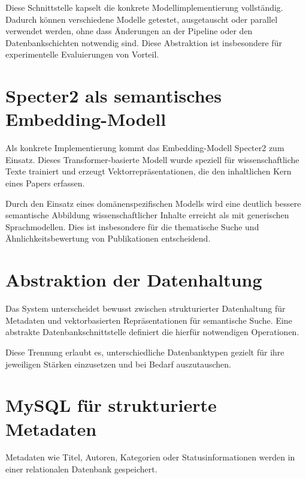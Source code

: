 Diese Schnittstelle kapselt die konkrete Modellimplementierung vollständig. Dadurch können verschiedene Modelle getestet, ausgetauscht oder parallel verwendet werden, ohne dass Änderungen an der Pipeline oder den Datenbankschichten notwendig sind. Diese Abstraktion ist insbesondere für experimentelle Evaluierungen von Vorteil.

\section{Specter2 als semantisches Embedding-Modell}

Als konkrete Implementierung kommt das Embedding-Modell Specter2 zum Einsatz. Dieses Transformer-basierte Modell wurde speziell für wissenschaftliche Texte trainiert und erzeugt Vektorrepräsentationen, die den inhaltlichen Kern eines Papers erfassen.



Durch den Einsatz eines domänenspezifischen Modells wird eine deutlich bessere semantische Abbildung wissenschaftlicher Inhalte erreicht als mit generischen Sprachmodellen. Dies ist insbesondere für die thematische Suche und Ähnlichkeitsbewertung von Publikationen entscheidend.

\section{Abstraktion der Datenhaltung}

Das System unterscheidet bewusst zwischen strukturierter Datenhaltung für Metadaten und vektorbasierten Repräsentationen für semantische Suche. Eine abstrakte Datenbankschnittstelle definiert die hierfür notwendigen Operationen.



Diese Trennung erlaubt es, unterschiedliche Datenbanktypen gezielt für ihre jeweiligen Stärken einzusetzen und bei Bedarf auszutauschen.

\section{MySQL für strukturierte Metadaten}

Metadaten wie Titel, Autoren, Kategorien oder Statusinformationen werden in einer relationalen Datenbank gespeichert.

